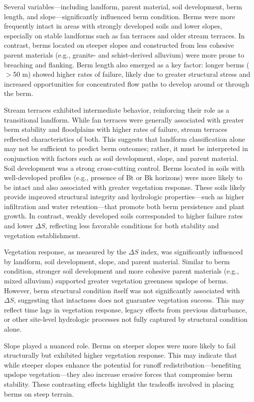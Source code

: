 \documentclass[review]{elsarticle}
\begin{document}
Several variables—including landform, parent material, soil development, berm length, and slope—significantly influenced berm condition. Berms were more frequently intact in areas with strongly developed soils and lower slopes, especially on stable landforms such as fan terraces and older stream terraces. In contrast, berms located on steeper slopes and constructed from less cohesive parent materials (e.g., granite- and schist-derived alluvium) were more prone to breaching and flanking. Berm length also emerged as a key factor: longer berms ($>$50 m) showed higher rates of failure, likely due to greater structural stress and increased opportunities for concentrated flow paths to develop around or through the berm.

Stream terraces exhibited intermediate behavior, reinforcing their role as a transitional landform. While fan terraces were generally associated with greater berm stability and floodplains with higher rates of failure, stream terraces reflected characteristics of both. This suggests that landform classification alone may not be sufficient to predict berm outcomes; rather, it must be interpreted in conjunction with factors such as soil development, slope, and parent material.
Soil development was a strong cross-cutting control. Berms located in soils with well-developed profiles (e.g., presence of Bt or Bk horizons) were more likely to be intact and also associated with greater vegetation response. These soils likely provide improved structural integrity and hydrologic properties—such as higher infiltration and water retention—that promote both berm persistence and plant growth. In contrast, weakly developed soils corresponded to higher failure rates and lower $\Delta S$, reflecting less favorable conditions for both stability and vegetation establishment.

Vegetation response, as measured by the $\Delta S$ index, was significantly influenced by landform, soil development, slope, and parent material. Similar to berm condition, stronger soil development and more cohesive parent materials (e.g., mixed alluvium) supported greater vegetation greenness upslope of berms. However, berm structural condition itself was not significantly associated with $\Delta S$, suggesting that intactness does not guarantee vegetation success. This may reflect time lags in vegetation response, legacy effects from previous disturbance, or other site-level hydrologic processes not fully captured by structural condition alone.

Slope played a nuanced role. Berms on steeper slopes were more likely to fail structurally but exhibited higher vegetation response. This may indicate that while steeper slopes enhance the potential for runoff redistribution—benefiting upslope vegetation—they also increase erosive forces that compromise berm stability. These contrasting effects highlight the tradeoffs involved in placing berms on steep terrain.
\end{document}
